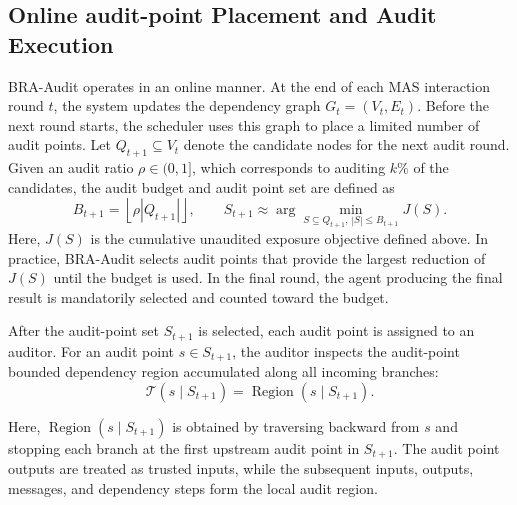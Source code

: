 \documentclass[letterpaper]{article} %
\begin{document}
\subsection{Online audit-point Placement and Audit Execution}

BRA-Audit operates in an online manner. At the end of each MAS interaction round \(t\), the system updates the dependency graph \(G_t=(V_t,E_t)\). Before the next round starts, the scheduler uses this graph to place a limited number of audit points. Let \(Q_{t+1}\subseteq V_t\) denote the candidate nodes for the next audit round. Given an audit ratio \(\rho\in(0,1]\), which corresponds to auditing \(k\%\) of the candidates, the audit budget and audit point set are defined as
\begin{equation}
B_{t+1}=\left\lfloor \rho |Q_{t+1}| \right\rfloor,
\qquad
S_{t+1}\approx
\arg\min_{S\subseteq Q_{t+1},\, |S|\leq B_{t+1}} J(S).
\end{equation}
Here, \(J(S)\) is the cumulative unaudited exposure objective defined above. In practice, BRA-Audit selects audit points that provide the largest reduction of \(J(S)\) until the budget is used. In the final round, the agent producing the final result is mandatorily selected and counted toward the budget.


After the audit-point set \(S_{t+1}\) is selected, each
audit point is assigned to an auditor. For an audit point
\(s\in S_{t+1}\), the auditor inspects the audit-point bounded
dependency region accumulated along all incoming branches:
\begin{equation}
\mathcal{T}(s\mid S_{t+1})
=
\operatorname{Region}(s\mid S_{t+1}).
\end{equation}

Here, \(\operatorname{Region}(s\mid S_{t+1})\) is obtained by
traversing backward from \(s\) and stopping each branch at
the first upstream audit point in \(S_{t+1}\). The audit point
outputs are treated as trusted inputs, while the subsequent
inputs, outputs, messages, and dependency steps form the local
audit region.
\end{document}
